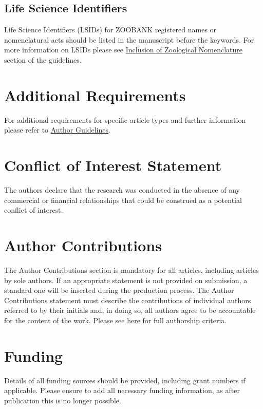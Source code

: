 \documentclass[utf8]{FrontiersinHarvard} %
\renewcommand*{\|}[1][]{\nonscript\:#1\vert\nonscript\:\mathopen{}}
\begin{document}
\subsection{Life Science Identifiers}
Life Science Identifiers (LSIDs) for ZOOBANK registered names or nomenclatural acts should be listed in the manuscript before the keywords. For more information on LSIDs please see \href{https://www.frontiersin.org/about/author-guidelines#Nomenclature}{Inclusion of Zoological Nomenclature} section of the guidelines.


\section{Additional Requirements}

For additional requirements for specific article types and further information please refer to \href{http://www.frontiersin.org/about/AuthorGuidelines#AdditionalRequirements}{Author Guidelines}.

\section*{Conflict of Interest Statement}

The authors declare that the research was conducted in the absence of any commercial or financial relationships that could be construed as a potential conflict of interest.

\section*{Author Contributions}

The Author Contributions section is mandatory for all articles, including articles by sole authors. If an appropriate statement is not provided on submission, a standard one will be inserted during the production process. The Author Contributions statement must describe the contributions of individual authors referred to by their initials and, in doing so, all authors agree to be accountable for the content of the work. Please see  \href{https://www.frontiersin.org/about/policies-and-publication-ethics#AuthorshipAuthorResponsibilities}{here} for full authorship criteria.

\section*{Funding}
Details of all funding sources should be provided, including grant numbers if applicable. Please ensure to add all necessary funding information, as after publication this is no longer possible.
\end{document}
